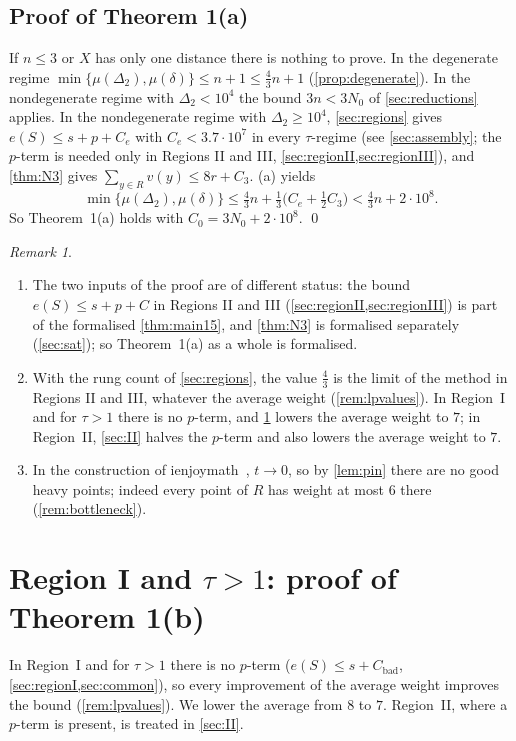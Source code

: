 \documentclass[11pt]{amsart}
\theoremstyle{definition}
\theoremstyle{remark}
\newtheorem{remark}[theorem]{Remark}
\newcommand{\Dt}{\Delta_2}
\newcommand{\mult}{\mu}
\begin{document}
\subsection{Proof of Theorem 1(a)}
If $n\le3$ or $X$ has only one distance there is nothing to prove. In the degenerate regime $\min\{\mult(\Dt),\mult(\delta)\}\le n+1\le\frac43n+1$ (\cref{prop:degenerate}). In the nondegenerate regime with $\Dt<10^4$ the bound $3n<3N_0$ of \cref{sec:reductions} applies. In the nondegenerate regime with $\Dt\ge10^4$, \cref{sec:regions} gives $e(S)\le s+p+C_e$ with $C_e<3.7\cdot10^7$ in every $\tau$-regime (see \cref{sec:assembly}; the $p$-term is needed only in Regions II and III, \cref{sec:regionII,sec:regionIII}), and \cref{thm:N3} gives $\sum_{y\in R}v(y)\le8r+C_3$. (a) yields
\[
\min\{\mult(\Dt),\mult(\delta)\}\le\tfrac43n+\tfrac13\bigl(C_e+\tfrac12C_3\bigr)<\tfrac43n+2\cdot10^8 .
\]
So Theorem~1(a) holds with $C_0=3N_0+2\cdot10^8$. \qed

\begin{remark}\label{rem:N3}
\begin{enumerate}[leftmargin=2em,label=(\alph*)]
\item The two inputs of the proof are of different status: the bound $e(S)\le s+p+C$ in Regions II and III (\cref{sec:regionII,sec:regionIII}) is part of the formalised \cref{thm:main15}, and \cref{thm:N3} is formalised separately (\cref{sec:sat}); so Theorem~1(a) as a whole is formalised.
\item With the rung count of \cref{sec:regions}, the value $\frac43$ is the limit of the method in Regions II and III, whatever the average weight (\cref{rem:lpvalues}). In Region~I and for $\tau>1$ there is no $p$-term, and \cref{sec:P4} lowers the average weight to $7$; in Region~II, \cref{sec:II} halves the $p$-term and also lowers the average weight to $7$.
\item In the construction of ienjoymath~\cite{ienjoymath}, $t\to0$, so by \cref{lem:pin} there are no good heavy points; indeed every point of $R$ has weight at most $6$ there (\cref{rem:bottleneck}).
\end{enumerate}
\end{remark}

\section{Region I and \texorpdfstring{$\tau>1$}{tau > 1}: proof of Theorem 1(b)}\label{sec:P4}

In Region~I and for $\tau>1$ there is no $p$-term ($e(S)\le s+C_{\mathrm{bad}}$, \cref{sec:regionI,sec:common}), so every improvement of the average weight improves the bound (\cref{rem:lpvalues}). We lower the average from $8$ to $7$. Region~II, where a $p$-term is present, is treated in \cref{sec:II}.
\end{document}
